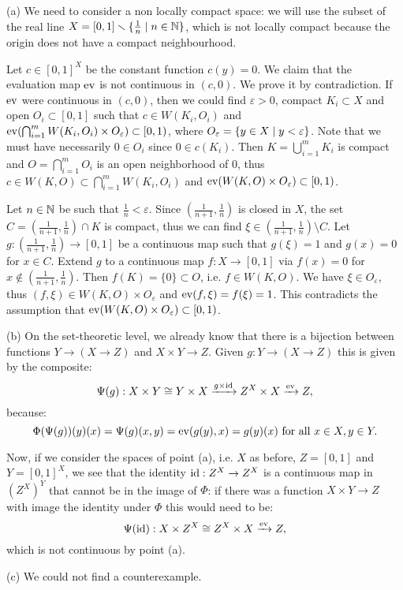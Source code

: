 \documentclass[a4paper,11pt,english]{article}
\begin{document}
\begin{exercise}[2]

(a) We need to consider a non locally compact space: we will use the subset of the real line $X=[0,1]\smallsetminus \{\frac{1}{n} \mid n \in \mathbb{N}\}$, which is not locally compact because the origin does not have a compact neighbourhood.

Let $c \in [0,1]^X$ be the constant function $c(y) = 0$. We claim that the evaluation map $\operatorname{ev}$ is not continuous in $(c,0)$. We prove it by contradiction. If $\operatorname{ev}$ were continuous in $(c,0)$, then we could find $\varepsilon > 0$, compact $K_i \subset X$ and open $O_i \subset [0,1]$ such that $c \in W(K_i,O_i)$ and $\operatorname{ev}(\bigcap_{i=1}^m W(K_i,O_i) \times O_\varepsilon) \subset [0,1)$, where $O_\varepsilon = \{y \in X \mid y <\varepsilon\}$. Note that we must have necessarily $0 \in O_i$ since $0 \in c(K_i)$. Then $K = \bigcup_{i=1}^m K_i$ is compact and $O = \bigcap_{i=1}^m O_i$ is an open neighborhood of $0$, thus $c \in W(K,O) \subset \bigcap_{i=1}^m W(K_i,O_i)$ and $\operatorname{ev}(W(K,O) \times O_\varepsilon) \subset [0,1)$.

Let $n \in \mathbb{N}$ be such that $\frac{1}{n} < \varepsilon$. Since $(\frac{1}{n+1},\frac{1}{n})$ is closed in $X$, the set $C  = (\frac{1}{n+1},\frac{1}{n}) \cap K$ is compact, thus we can find $\xi \in (\frac{1}{n+1},\frac{1}{n}) \setminus C$. Let $g : (\frac{1}{n+1},\frac{1}{n}) \to [0,1]$ be a continuous map such that $g(\xi)= 1$ and $g(x) = 0$ for $x \in C$. Extend $g$ to a continuous map $f : X \to [0,1]$ via $f(x) = 0$ for $x \notin (\frac{1}{n+1},\frac{1}{n})$. Then $f(K) = \{0\} \subset O$, i.e. $f \in W(K,O)$. We have $\xi \in O_\varepsilon$, thus $(f,\xi)  \in W(K,O) \times O_\varepsilon$ and $\operatorname{ev}(f,\xi) = f(\xi) = 1$. This contradicts the assumption that $\operatorname{ev}(W(K,O) \times O_\varepsilon) \subset [0,1)$.

(b) On the set-theoretic level, we already know that there is a bijection between functions $Y\to (X\to Z)$ and $X\times Y\to Z$. Given $g:Y\to (X\to Z)$ this is given by the composite:
\[\Psi(g):X\times Y\cong Y\times X\xrightarrow{g\times\operatorname{id}}Z^X\times X\xrightarrow{\operatorname{ev}}Z,\]
because:
\[\Phi(\Psi(g))(y)(x)=\Psi(g)(x,y)=\operatorname{ev}(g(y),x)=g(y)(x)\text{ for all }x\in X,y\in Y.\]

Now, if we consider the spaces of point (a), i.e. $X$ as before, $Z=[0,1]$ and $Y=[0,1]^X$, we see that the identity $\operatorname{id}:Z^X\to Z^X$ is a continuous map in $(Z^X)^Y$ that cannot be in the image of $\Phi$: if there was a function $X\times Y\to Z$ with image the identity under $\Phi$ this would need to be:
\[\Psi(\operatorname{id}):X\times Z^X\cong Z^X\times X\xrightarrow{\operatorname{ev}}Z,\]
which is not continuous by point (a).

(c) We could not find a counterexample.

\end{exercise}
\end{document}

